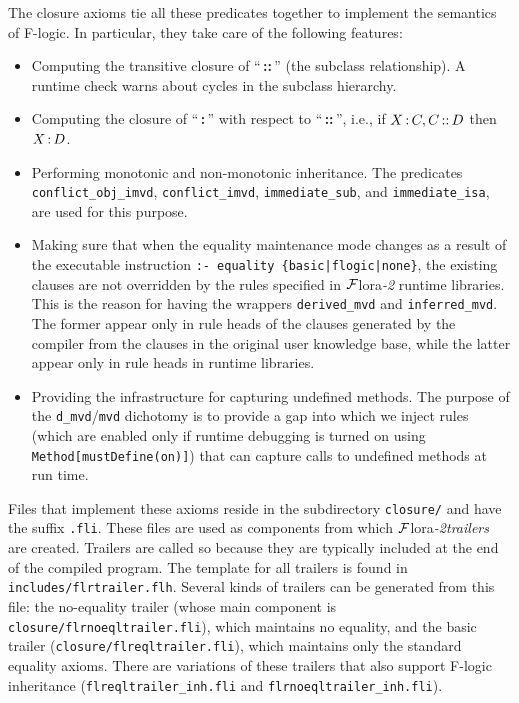 \documentclass[11pt]{article}
\newcommand{\FLORA}{{\mbox{\sc ${\cal F}${lora}\rm\emph{-2}}}\xspace}
\newcommand{\FLSYSTEM}{\FLORA}
\newcommand{\isa}{\,{\bf{:}}\,}
\newcommand{\subcl}{\,{\bf{::}}\,}
\newcommand{\fl}{\mbox{F-logic}\xspace}
\begin{document}
{
The closure axioms tie all these predicates together to implement the
semantics of \fl. In particular, they take care of the following features:
\begin{itemize}
\item Computing the transitive closure of ``\subcl'' (the subclass
  relationship).  A runtime check warns about cycles in the subclass
  hierarchy.
\item Computing the closure of ``\isa'' with respect to ``\subcl'', i.e.,
  if $X\isa C, C\subcl D$ then $X\isa D$.
\item Performing monotonic and non-monotonic inheritance. The predicates
  {\tt conflict\_obj\_imvd}, {\tt conflict\_imvd}, {\tt immediate\_sub},
  and {\tt immediate\_isa}, are used for this purpose.
\item Making sure that when the equality maintenance mode changes as a
  result of the executable instruction {\tt :- equality
  \{basic|flogic|none\}}, the existing clauses are not overridden by the
  rules specified in \FLSYSTEM runtime libraries. This is the reason for
  having the wrappers {\tt derived\_mvd} and {\tt inferred\_mvd}. The former
  appear only in rule heads of the clauses generated by the compiler
  from the clauses in the original user knowledge base, while the latter appear only in
  rule heads in runtime libraries.
\item Providing the infrastructure for capturing undefined methods.
  The purpose of the {\tt d\_mvd}/{\tt mvd} dichotomy is to provide a gap
  into which we inject rules
  (which are enabled only if runtime debugging is turned on using
  {\tt Method[mustDefine(on)]}) that can capture calls to undefined
  methods at run time.
\end{itemize}
Files that implement these axioms reside in the subdirectory
\texttt{closure/} and have the suffix {\tt .fli}.  These files are used as
components from which \FLSYSTEM \emph{trailers} are created.  Trailers are
called so because they are typically included at the end of the compiled
program. The template for all trailers is found in
{\tt includes/flrtrailer.flh}.  Several kinds of trailers can be generated from
this file: the no-equality trailer (whose main component is {\tt
  closure/flrnoeqltrailer.fli}), which maintains no equality, and the basic
trailer ({\tt closure/flreqltrailer.fli}), which maintains only the
standard equality axioms.
There are variations of these trailers that also support \fl inheritance
({\tt flreqltrailer\_inh.fli}  and {\tt flrnoeqltrailer\_inh.fli}).

}
\end{document}
